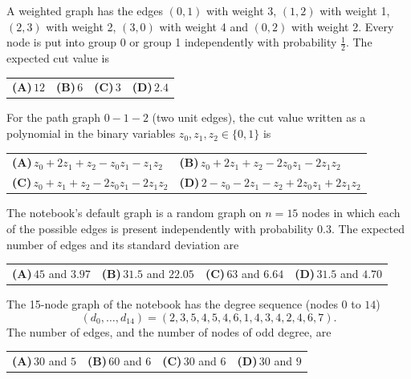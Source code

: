 \documentclass[11pt,a4paper]{article}
\newcommand{\optlabel}[1]{\textbf{(#1)}}
\newenvironment{qitem}[1]{\begin{list}{}{\setlength{\leftmargin}{3.3em}\setlength{\labelwidth}{3.1em}%
  \setlength{\labelsep}{0.2em}\setlength{\topsep}{3pt}\setlength{\parsep}{3pt}}\item[\textbf{Q.#1}\hfill]}{\end{list}}
\newcommand{\qsep}{\par\vspace{2pt}{\color{black!15}\hrule}\vspace{4pt}}
\begin{document}
\begin{qitem}{3}
A weighted graph has the edges $(0,1)$ with weight 3, $(1,2)$ with weight 1, $(2,3)$ with weight 2, $(3,0)$ with
weight 4 and $(0,2)$ with weight 2. Every node is put into group 0 or group 1 independently with probability $\tfrac12$.
The expected cut value is
\par\smallskip\noindent\begin{tabularx}{\linewidth}{@{}*{4}{L}@{}}
\optlabel{A}\,$12$ & \optlabel{B}\,$6$ & \optlabel{C}\,$3$ & \optlabel{D}\,$2.4$
\end{tabularx}
\end{qitem}
\qsep

\begin{qitem}{4}
For the path graph $0 - 1 - 2$ (two unit edges), the cut value written as a polynomial in the binary variables
$z_0, z_1, z_2 \in \{0, 1\}$ is
\par\smallskip\noindent\begin{tabularx}{\linewidth}{@{}*{2}{L}@{}}
\optlabel{A}\,$z_0 + 2z_1 + z_2 - z_0z_1 - z_1z_2$ & \optlabel{B}\,$z_0 + 2z_1 + z_2 - 2z_0z_1 - 2z_1z_2$ \\[3pt]
\optlabel{C}\,$z_0 + z_1 + z_2 - 2z_0z_1 - 2z_1z_2$ & \optlabel{D}\,$2 - z_0 - 2z_1 - z_2 + 2z_0z_1 + 2z_1z_2$
\end{tabularx}
\end{qitem}
\qsep

\begin{qitem}{5}
The notebook's default graph is a random graph on $n = 15$ nodes in which each of the possible edges is present
independently with probability $0.3$. The expected number of edges and its standard deviation are
\par\smallskip\noindent\begin{tabularx}{\linewidth}{@{}*{4}{L}@{}}
\optlabel{A}\,$45$ and $3.97$ & \optlabel{B}\,$31.5$ and $22.05$ & \optlabel{C}\,$63$ and $6.64$ & \optlabel{D}\,$31.5$ and $4.70$
\end{tabularx}
\end{qitem}
\qsep

\begin{qitem}{6}
The 15-node graph of the notebook has the degree sequence (nodes $0$ to $14$)
\[ (d_0, \dots, d_{14}) = (2, 3, 5, 4, 5, 4, 6, 1, 4, 3, 4, 2, 4, 6, 7). \]
The number of edges, and the number of nodes of odd degree, are
\par\smallskip\noindent\begin{tabularx}{\linewidth}{@{}*{4}{L}@{}}
\optlabel{A}\,$30$ and $5$ & \optlabel{B}\,$60$ and $6$ & \optlabel{C}\,$30$ and $6$ & \optlabel{D}\,$30$ and $9$
\end{tabularx}
\end{qitem}
\qsep
\end{document}
